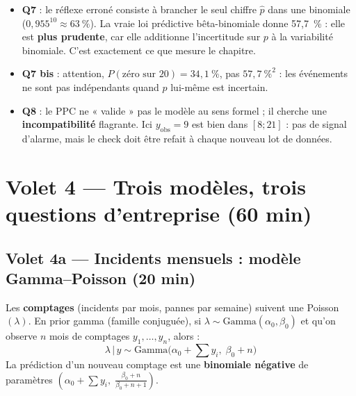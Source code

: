 \documentclass[11pt,a4paper]{article}
\newcommand{\given}{\,\vert\,}
\begin{document}
\begin{piege}[Questions 7 et 8]
\begin{itemize}[leftmargin=4mm, itemsep=0.5mm]
  \item \textbf{Q7} : le réflexe erroné consiste à brancher le seul chiffre
        $\hat p$ dans une binomiale ($0{,}955^{10} \approx 63~\%$). La vraie
        loi prédictive bêta-binomiale donne 57,7~\% : elle est \textbf{plus
        prudente}, car elle additionne l'incertitude sur $p$ à la variabilité
        binomiale. C'est exactement ce que mesure le chapitre.
  \item \textbf{Q7 bis} : attention, $P(\text{zéro sur 20}) = 34{,}1~\%$, pas
        $57{,}7~\%^2$ : les événements ne sont pas indépendants quand $p$
        lui-même est incertain.
  \item \textbf{Q8} : le PPC ne « valide » pas le modèle au sens formel ; il
        cherche une \textbf{incompatibilité} flagrante. Ici $y_{\text{obs}} = 9$
        est bien dans $[8; 21]$ : pas de signal d'alarme, mais le check doit
        être refait à chaque nouveau lot de données.
\end{itemize}
\end{piege}

\section{Volet 4 --- Trois modèles, trois questions d'entreprise (60 min)}

\subsection{Volet 4a --- Incidents mensuels : modèle Gamma--Poisson (20 min)}

\begin{rappel}
Les \textbf{comptages} (incidents par mois, pannes par semaine) suivent une
Poisson$(\lambda)$. En prior gamma (famille conjuguée), si
$\lambda \sim \text{Gamma}(\alpha_0, \beta_0)$ et qu'on observe $n$ mois de
comptages $y_1, \dots, y_n$, alors :
\[
\lambda \given y \sim \text{Gamma}\bigl(\alpha_0 + \textstyle\sum y_i,\;
\beta_0 + n\bigr)
\]
La prédiction d'un nouveau comptage est une \textbf{binomiale négative} de
paramètres $(\alpha_0 + \sum y_i,\; \frac{\beta_0 + n}{\beta_0 + n + 1})$.
\end{rappel}
\end{document}
